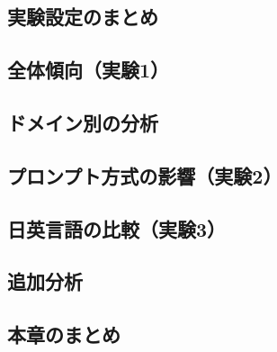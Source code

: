 
\subsection{実験設定のまとめ}\label{subsec:setup-summary}


\subsection{全体傾向（実験1）}\label{subsec:overall}


\subsection{ドメイン別の分析}\label{subsec:domain-analysis}


\subsection{プロンプト方式の影響（実験2）}\label{subsec:prompt-analysis}


\subsection{日英言語の比較（実験3）}\label{subsec:language-comparison}


\subsection{追加分析}\label{subsec:additional}


\subsection{本章のまとめ}\label{subsec:results-summary}

